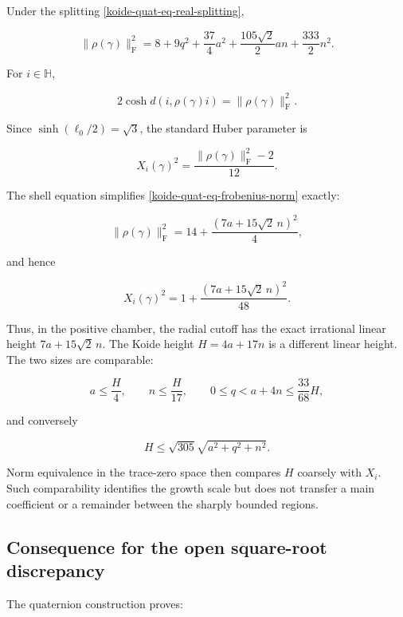 Under the splitting \eqref{koide-quat-eq-real-splitting},

\begin{equation}\label{koide-quat-eq-frobenius-norm}
 \|\rho(\gamma)\|_{\mathrm F}^2
 =8+9q^2+\frac{37}{4}a^2
   +\frac{105\sqrt2}{2}an+\frac{333}{2}n^2.
\end{equation}

For \(i\in\mathbb H\),

\[
 2\cosh d(i,\rho(\gamma)i)=\|\rho(\gamma)\|_{\mathrm F}^2.
\]

Since \(\sinh(\ell_0/2)=\sqrt3\), the standard Huber parameter is

\begin{equation}\label{koide-quat-eq-huber-parameter}
 X_i(\gamma)^2
 =\frac{\|\rho(\gamma)\|_{\mathrm F}^2-2}{12}.
\end{equation}

The shell equation simplifies \eqref{koide-quat-eq-frobenius-norm} exactly:

\[
 \|\rho(\gamma)\|_{\mathrm F}^2
 =14+\frac{(7a+15\sqrt2\,n)^2}{4},
\]

and hence

\begin{equation}\label{koide-quat-eq-radial-height}
 \boxed{
 X_i(\gamma)^2
 =1+\frac{(7a+15\sqrt2\,n)^2}{48}.}
\end{equation}

Thus, in the positive chamber, the radial cutoff has the exact irrational linear height \(7a+15\sqrt2\,n\). The Koide height \(H=4a+17n\) is a different linear height. The two sizes are comparable:

\[
 a\le\frac H4,\qquad
 n\le\frac H{17},\qquad
 0\le q<a+4n\le\frac{33}{68}H,
\]

and conversely

\[
 H\le\sqrt{305}\sqrt{a^2+q^2+n^2}.
\]

Norm equivalence in the trace-zero space then compares \(H\) coarsely with \(X_i\). Such comparability identifies the growth scale but does not transfer a main coefficient or a remainder between the sharply bounded regions.

\subsection{Consequence for the open square-root discrepancy}\label{koide-quat-consequence-for-the-open-square-root-discrepancy}

The quaternion construction proves:

